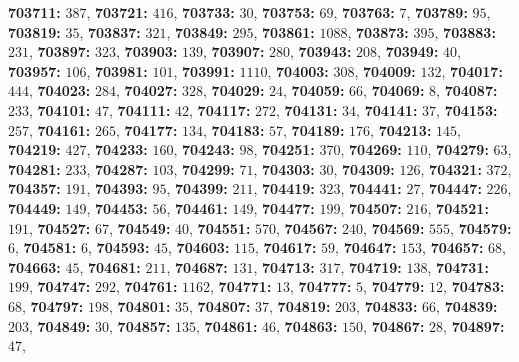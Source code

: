 \textsf{\bfseries 703711:} $387$, \textsf{\bfseries 703721:} $416$, \textsf{\bfseries 703733:} $30$, \textsf{\bfseries 703753:} $69$, \textsf{\bfseries 703763:} $7$, \textsf{\bfseries 703789:} $95$, \textsf{\bfseries 703819:} $35$, \textsf{\bfseries 703837:} $321$, \textsf{\bfseries 703849:} $295$, \textsf{\bfseries 703861:} $1088$, \textsf{\bfseries 703873:} $395$, \textsf{\bfseries 703883:} $231$, \textsf{\bfseries 703897:} $323$, \textsf{\bfseries 703903:} $139$, \textsf{\bfseries 703907:} $280$, \textsf{\bfseries 703943:} $208$, \textsf{\bfseries 703949:} $40$, \textsf{\bfseries 703957:} $106$, \textsf{\bfseries 703981:} $101$, \textsf{\bfseries 703991:} $1110$, \textsf{\bfseries 704003:} $308$, \textsf{\bfseries 704009:} $132$, \textsf{\bfseries 704017:} $444$, \textsf{\bfseries 704023:} $284$, \textsf{\bfseries 704027:} $328$, \textsf{\bfseries 704029:} $24$, \textsf{\bfseries 704059:} $66$, \textsf{\bfseries 704069:} $8$, \textsf{\bfseries 704087:} $233$, \textsf{\bfseries 704101:} $47$, \textsf{\bfseries 704111:} $42$, \textsf{\bfseries 704117:} $272$, \textsf{\bfseries 704131:} $34$, \textsf{\bfseries 704141:} $37$, \textsf{\bfseries 704153:} $257$, \textsf{\bfseries 704161:} $265$, \textsf{\bfseries 704177:} $134$, \textsf{\bfseries 704183:} $57$, \textsf{\bfseries 704189:} $176$, \textsf{\bfseries 704213:} $145$, \textsf{\bfseries 704219:} $427$, \textsf{\bfseries 704233:} $160$, \textsf{\bfseries 704243:} $98$, \textsf{\bfseries 704251:} $370$, \textsf{\bfseries 704269:} $110$, \textsf{\bfseries 704279:} $63$, \textsf{\bfseries 704281:} $233$, \textsf{\bfseries 704287:} $103$, \textsf{\bfseries 704299:} $71$, \textsf{\bfseries 704303:} $30$, \textsf{\bfseries 704309:} $126$, \textsf{\bfseries 704321:} $372$, \textsf{\bfseries 704357:} $191$, \textsf{\bfseries 704393:} $95$, \textsf{\bfseries 704399:} $211$, \textsf{\bfseries 704419:} $323$, \textsf{\bfseries 704441:} $27$, \textsf{\bfseries 704447:} $226$, \textsf{\bfseries 704449:} $149$, \textsf{\bfseries 704453:} $56$, \textsf{\bfseries 704461:} $149$, \textsf{\bfseries 704477:} $199$, \textsf{\bfseries 704507:} $216$, \textsf{\bfseries 704521:} $191$, \textsf{\bfseries 704527:} $67$, \textsf{\bfseries 704549:} $40$, \textsf{\bfseries 704551:} $570$, \textsf{\bfseries 704567:} $240$, \textsf{\bfseries 704569:} $555$, \textsf{\bfseries 704579:} $6$, \textsf{\bfseries 704581:} $6$, \textsf{\bfseries 704593:} $45$, \textsf{\bfseries 704603:} $115$, \textsf{\bfseries 704617:} $59$, \textsf{\bfseries 704647:} $153$, \textsf{\bfseries 704657:} $68$, \textsf{\bfseries 704663:} $45$, \textsf{\bfseries 704681:} $211$, \textsf{\bfseries 704687:} $131$, \textsf{\bfseries 704713:} $317$, \textsf{\bfseries 704719:} $138$, \textsf{\bfseries 704731:} $199$, \textsf{\bfseries 704747:} $292$, \textsf{\bfseries 704761:} $1162$, \textsf{\bfseries 704771:} $13$, \textsf{\bfseries 704777:} $5$, \textsf{\bfseries 704779:} $12$, \textsf{\bfseries 704783:} $68$, \textsf{\bfseries 704797:} $198$, \textsf{\bfseries 704801:} $35$, \textsf{\bfseries 704807:} $37$, \textsf{\bfseries 704819:} $203$, \textsf{\bfseries 704833:} $66$, \textsf{\bfseries 704839:} $203$, \textsf{\bfseries 704849:} $30$, \textsf{\bfseries 704857:} $135$, \textsf{\bfseries 704861:} $46$, \textsf{\bfseries 704863:} $150$, \textsf{\bfseries 704867:} $28$, \textsf{\bfseries 704897:} $47$, 
